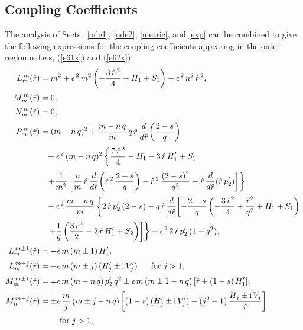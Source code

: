 \documentclass[12pt,prb,aps]{revtex4-1}
\begin{document}
\subsection{Coupling Coefficients}\label{coupl}
The analysis of Sects.~\ref{ode1}, \ref{ode2}, \ref{metric}, and \ref{exp} can be combined to give
the following expressions for the coupling coefficients appearing in the outer-region  o.d.e.s, (\ref{e61x}) and (\ref{e62x}):\,\cite{am1}
\begin{align}
L_m^{\,m}(\hat{r})&= m^2 + \epsilon^{\,2}\,m^2\left(-\frac{3\,\hat{r}^{\,2}}{4} + H_1+S_1\right)+ \epsilon^{\,2}\,n^2\,\hat{r}^{\,2},\\[0.5ex]
M_m^{\,m}(\hat{r})&= 0,\\[0.5ex]
N_m^{\,m}(\hat{r})&= 0,\\[0.5ex]
P_m^{\,m}(\hat{r}) &= (m-n\,q)^2+ \frac{m-n\,q}{m}\,q\,\hat{r}\,\frac{d}{d\hat{r}}\!\left(\frac{2-s}{q}\right)\nonumber\\[0.5ex]
&\phantom{=}+\epsilon^{\,2}\,(m-n\,q)^2\left\{\frac{7\,\hat{r}^{\,2}}{4} -H_1-3\,\hat{r}\,H_1'+S_1\right.\nonumber\\[0.5ex]
&\phantom{=} \left.+\frac{1}{m^2}\left[\frac{n}{m}\,\hat{r}\,\frac{d}{d\hat{r}}\!\left(\hat{r}^{\,2}\,\frac{2-s}{q}\right)
-\hat{r}^{\,2}\,\frac{(2-s)^2}{q^2}-\hat{r}\,\frac{d}{d\hat{r}}(\hat{r}\,p_2')\right]\right\}\nonumber\\[0.5ex]
&\phantom{=}-\epsilon^{\,2}\,\frac{m-n\,q}{m}\left\{
2\,\hat{r}\,p_2'\,(2-s) -q\,\hat{r}\,\frac{d}{d\hat{r}}\!\left[
-\frac{2-s}{q}\left(-\frac{3\,\hat{r}^2}{4} +\frac{\hat{r}^2}{q^2} +H_1+S_1\right)\right.\right.\nonumber\\[0.5ex]
&\phantom{=}\left.\left.+\frac{1}{q}\left(\frac{3\,\hat{r}^2}{2}-2\,\hat{r}\,H_1'+S_2\right)\right]\right\}+\epsilon^{\,2}\,2\,\hat{r}\,p_2'\,(1-q^2),\\[0.5ex]
L_m^{\,m\pm 1}(\hat{r}) &= -\epsilon\,m\,(m\pm 1)\,H_1',\\[0.5ex]
L_m^{\,m\pm j}(\hat{r})&= - \epsilon\,m\,(m\pm j)\,(H_j'\pm {\rm i}\,V_j')\mbox{~~~~~for $j>1$},\\[0.5ex]
M_m^{\,m\pm 1}(\hat{r}) &= \mp \epsilon\,m\,(m-n\,q)\,p_2'\,q^2\pm \epsilon\,m\,(m\pm 1-n\,q)\,[\hat{r}+ (1-s)\,H_1'],\\[0.5ex]
M_m^{\,m\pm j}(\hat{r}) &= \pm \epsilon\,\frac{m}{j}\,(m\pm j-n\,q)\left[(1-s)\,(H_j'\pm {\rm i}\,V_j')-(j^2-1)\,\frac{H_j\pm{\rm i} \,V_j}{\hat{r}}\right]\nonumber\\[0.5ex]&\phantom{=}\mbox{~~~~~for $j>1$},\\[0.5ex]

\end{align}
\end{document}
